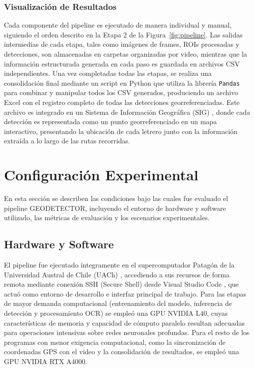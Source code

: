 \documentclass[runningheads]{llncs}
\begin{document}
\subsubsection{Visualización de Resultados}
Cada componente del pipeline es ejecutado de manera individual y manual, 
siguiendo el orden descrito en la Etapa 2 de la Figura~\ref{fig:pipeline}. Las salidas intermedias de cada etapa, tales como imágenes de frames, 
ROIs procesadas y detecciones, son almacenadas en carpetas organizadas 
por video, mientras que la información estructurada generada en cada 
paso es guardada en archivos CSV independientes. Una vez completadas todas las etapas, se realiza una consolidación final mediante un script en Python que utiliza 
la librería \texttt{Pandas} \cite{pandas} para combinar y manipular todos los CSV generados, 
produciendo un archivo Excel con el registro completo de todas 
las detecciones georreferenciadas. Este archivo es integrado en un 
Sistema de Información Geográfica (SIG) \cite{sig-referencia}, donde 
cada detección es representada como un punto georreferenciado en un 
mapa interactivo, presentando la ubicación de cada letrero junto con 
la información extraída a lo largo de las rutas recorridas.

\section{Configuración Experimental}
En esta sección se describen las condiciones bajo las cuales fue 
evaluado el pipeline GEODETECTOR, incluyendo el entorno de hardware 
y software utilizado, las métricas de evaluación y los escenarios
experimentales.

\subsection{Hardware y Software}

El pipeline fue ejecutado íntegramente en el supercomputador Patagón 
de la Universidad Austral de Chile (UACh) \cite{patagon}, accediendo 
a sus recursos de forma remota mediante conexión SSH (Secure Shell) desde Visual 
Studio Code \cite{vscode}, que actuó como entorno de desarrollo e interfaz principal 
de trabajo. Para las etapas de mayor demanda computacional 
(entrenamiento del modelo, inferencia de detección y procesamiento 
OCR) se empleó una GPU NVIDIA L40, cuyas características de memoria 
y capacidad de cómputo paralelo resultan adecuadas para operaciones 
intensivas sobre redes neuronales profundas. Para el resto de los 
programas con menor exigencia computacional, como la sincronización de 
coordenadas GPS con el video y la consolidación de resultados, se 
empleó una GPU NVIDIA RTX A4000.
\end{document}
